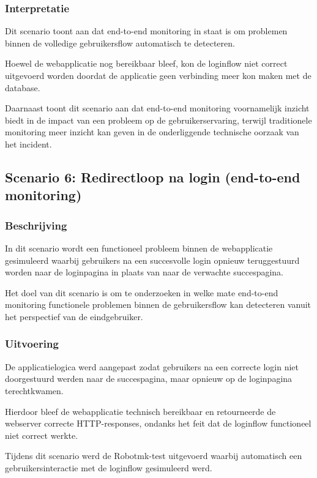 \subsubsection{Interpretatie}

Dit scenario toont aan dat end-to-end monitoring in staat is om problemen binnen de volledige gebruikersflow automatisch te detecteren.

Hoewel de webapplicatie nog bereikbaar bleef, kon de loginflow niet correct uitgevoerd worden doordat de applicatie geen verbinding meer kon maken met de database.

Daarnaast toont dit scenario aan dat end-to-end monitoring voornamelijk inzicht biedt in de impact van een probleem op de gebruikerservaring, terwijl traditionele monitoring meer inzicht kan geven in de onderliggende technische oorzaak van het incident.

\subsection{Scenario 6: Redirectloop na login (end-to-end monitoring)}

\subsubsection{Beschrijving}

In dit scenario wordt een functioneel probleem binnen de webapplicatie gesimuleerd waarbij gebruikers na een succesvolle login opnieuw teruggestuurd worden naar de loginpagina in plaats van naar de verwachte succespagina.

Het doel van dit scenario is om te onderzoeken in welke mate end-to-end monitoring functionele problemen binnen de gebruikersflow kan detecteren vanuit het perspectief van de eindgebruiker.

\subsubsection{Uitvoering}

De applicatielogica werd aangepast zodat gebruikers na een correcte login niet doorgestuurd werden naar de succespagina, maar opnieuw op de loginpagina terechtkwamen.

Hierdoor bleef de webapplicatie technisch bereikbaar en retourneerde de webserver correcte HTTP-responses, ondanks het feit dat de loginflow functioneel niet correct werkte.

Tijdens dit scenario werd de Robotmk-test uitgevoerd waarbij automatisch een gebruikersinteractie met de loginflow gesimuleerd werd.

